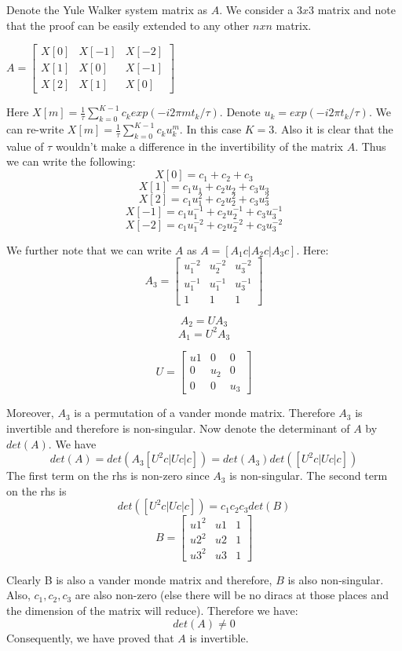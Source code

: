 \documentclass{article}
\begin{document}
Denote the Yule Walker system matrix as $A$. We consider a $3x3$ matrix and note that the proof can be easily extended to any other $nxn$ matrix.

$A = \begin{bmatrix}
X[0] & X[-1] & X[-2]\\
X[1] & X[0] & X[-1]\\
X[2] & X[1] & X[0]
\end{bmatrix}$

Here $X[m] = \frac{1}{\tau} \sum_{k=0}^{K-1} c_k exp(-i 2 \pi m t_k / \tau)$. Denote $u_k = exp(-i 2\pi t_k / \tau)$. We can re-write $X[m] = \frac{1}{\tau} \sum_{k=0}^{K-1}c_k u_k^m$. In this case $K=3$. Also it is clear that the value of $\tau$ wouldn't make a difference in the invertibility of the matrix $A$. Thus we can write the following:
$$X[0] = c_1 + c_2 + c_3$$
$$X[1] = c_1u_1 + c_2 u_2 + c_3 u_3$$
$$X[2] = c_1 u_1^2 + c_2 u_2^2 + c_3u_3^2$$
$$X[-1] = c_1 u_1^{-1} + c_2 u_2^{-1} + c_3 u_3^{-1}$$
$$X[-2] = c_1 u_1^{-2} + c_2 u_2^{-2} + c_3 u_3^{-2}$$

We further note that we can write $A$ as $A = [A_1c | A_2c | A_3c]$. Here:
$$A_3 = \begin{bmatrix}
u_1^{-2} & u_2^{-2} & u_3^{-2}\\
u_1^{-1} & u_1^{-1} & u_3^{-1}\\
 1 &  1 & 1
\end{bmatrix}$$

$$A_2 = UA_3$$
$$A_1 = U^2 A_3$$

$$U = \begin{bmatrix}
u1 & 0 & 0\\
0 & u_2 & 0\\
0 & 0 & u_3
\end{bmatrix}$$

Moreover, $A_3$ is a permutation of a vander monde matrix. Therefore $A_3$ is invertible and therefore is non-singular. Now denote the determinant of $A$ by $det(A)$. We have
$$det(A) = det(A_3 [U^2c | Uc | c]) = det(A_3) det([U^2c | Uc | c])$$
The first term on the rhs is non-zero since $A_3$ is non-singular. The second term on the rhs is
$$det([U^2c | Uc | c]) = c_1 c_2 c_3 det(B)$$
$$B = \begin{bmatrix}
u1^2 & u1 & 1\\
u2^2 & u2 & 1\\
u3^2 & u3 & 1
\end{bmatrix}$$

Clearly B is also a vander monde matrix and therefore, $B$ is also non-singular. Also, $c_1, c_2, c_3$ are also non-zero (else there will be no diracs at those places and the dimension of the matrix will reduce). Therefore we have:
$$det(A) \ne 0$$
Consequently, we have proved that $A$ is invertible.
\end{document}
